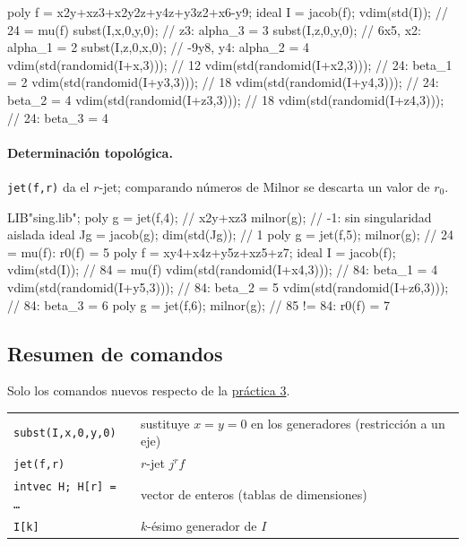 \documentclass[11pt,a4paper]{article}
\begin{document}
\begin{singular}
poly f = x2y+xz3+x2y2z+y4z+y3z2+x6-y9;
ideal I = jacob(f);
vdim(std(I));               // 24 = mu(f)
subst(I,x,0,y,0);           // z3: alpha_3 = 3
subst(I,z,0,y,0);           // 6x5, x2: alpha_1 = 2
subst(I,z,0,x,0);           // -9y8, y4: alpha_2 = 4
vdim(std(randomid(I+x,3)));   // 12
vdim(std(randomid(I+x2,3)));  // 24: beta_1 = 2
vdim(std(randomid(I+y3,3)));  // 18
vdim(std(randomid(I+y4,3)));  // 24: beta_2 = 4
vdim(std(randomid(I+z3,3)));  // 18
vdim(std(randomid(I+z4,3)));  // 24: beta_3 = 4
\end{singular}

\paragraph{Determinación topológica.} \texttt{jet(f,r)} da el $r$-jet; comparando números de Milnor se descarta un valor de $r_0$.

\begin{singular}
LIB"sing.lib";
poly g = jet(f,4);          // x2y+xz3
milnor(g);                  // -1: sin singularidad aislada
ideal Jg = jacob(g);
dim(std(Jg));               // 1
poly g = jet(f,5);
milnor(g);                  // 24 = mu(f): r0(f) = 5
poly f = xy4+x4z+y5z+xz5+z7;
ideal I = jacob(f);
vdim(std(I));               // 84 = mu(f)
vdim(std(randomid(I+x4,3)));  // 84: beta_1 = 4
vdim(std(randomid(I+y5,3)));  // 84: beta_2 = 5
vdim(std(randomid(I+z6,3)));  // 84: beta_3 = 6
poly g = jet(f,6);
milnor(g);                  // 85 != 84: r0(f) = 7
\end{singular}

\subsection*{Resumen de comandos}

Solo los comandos nuevos respecto de la \hyperref[sec:p3]{práctica 3}.

\begin{center}
\small
\begin{tabular}{@{}p{}p{}@{}}
\hline
\texttt{subst(I,x,0,y,0)} & sustituye $x = y = 0$ en los generadores (restricción a un eje) \\
\texttt{jet(f,r)} & $r$-jet $j^r f$ \\
\texttt{intvec H;\ H[r] = \dots} & vector de enteros (tablas de dimensiones) \\
\texttt{I[k]} & $k$-ésimo generador de $I$ \\
\hline
\end{tabular}
\end{center}
\end{document}
